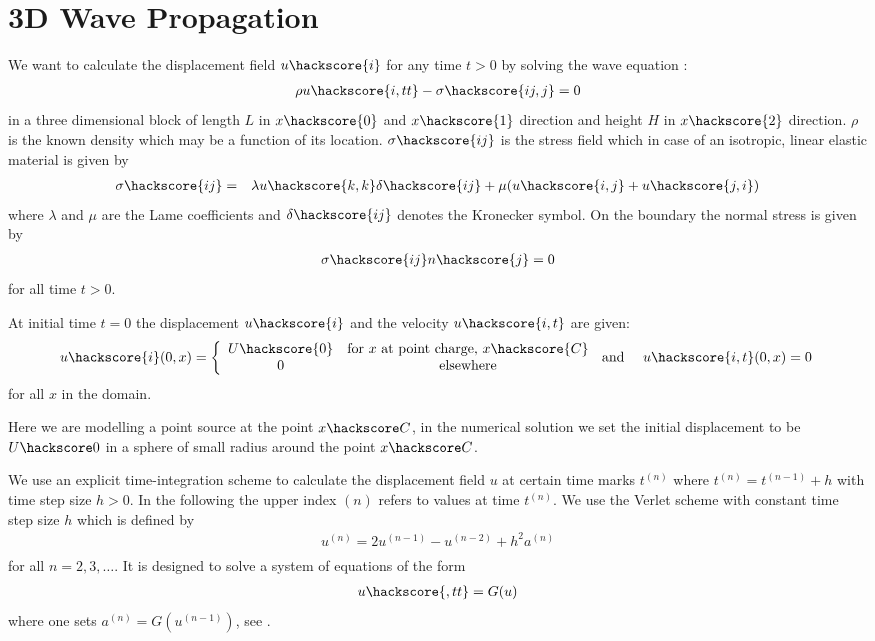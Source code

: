 \section{3D Wave Propagation}
\label{WAVE CHAP}

We want to calculate the displacement field $u\hackscore{i}$ for any time $t>0$ by solving the wave equation
:
\begin{eqnarray}\label{WAVE general problem}
\rho u\hackscore{i,tt} - \sigma\hackscore{ij,j}=0
\end{eqnarray}
in a three dimensional block of length $L$ in $x\hackscore{0}$
and $x\hackscore{1}$ direction and height $H$
in $x\hackscore{2}$ direction. $\rho$ is the known density which may be a function of its location.
$\sigma\hackscore{ij}$ is the stress field  which in case of an isotropic, linear elastic material is given by
\begin{eqnarray} \label{WAVE stress}
\sigma\hackscore{ij} & = & \lambda u\hackscore{k,k} \delta\hackscore{ij} + \mu ( u\hackscore{i,j} + u\hackscore{j,i})
\end{eqnarray}
where $\lambda$ and $\mu$ are the Lame coefficients 
 and $\delta\hackscore{ij}$ denotes the Kronecker symbol.
On the boundary the normal stress is given by
\begin{eqnarray} \label{WAVE natural}
\sigma\hackscore{ij}n\hackscore{j}=0
\end{eqnarray}
for all time $t>0$. 

At initial time $t=0$ the displacement 
$u\hackscore{i}$ and the velocity $u\hackscore{i,t}$ are given:
\begin{eqnarray} \label{WAVE initial}
u\hackscore{i}(0,x)= \left\{\begin{array}{cc} U\hackscore{0} & \mbox{for $x$ at point charge, $x\hackscore{C}$} \\ 0 & \mbox{elsewhere}\end{array}  \right. & \mbox{ and } & u\hackscore{i,t}(0,x)=0 \; 
\end{eqnarray}
for all $x$ in the domain. 

Here we are modelling a point source at the point $x\hackscore C$, in the numerical solution we
 set the initial displacement to be $U\hackscore 0$ in a sphere of small radius around the point
 $x\hackscore C$.  

We use an explicit time-integration scheme to calculate the displacement field $u$ at 
certain time marks $t^{(n)}$ where $t^{(n)}=t^{(n-1)}+h$ with time step size $h>0$. In the following the upper index ${(n)}$ refers to values at time $t^{(n)}$. We use the Verlet scheme  with constant time step size $h$
which is defined by
\begin{eqnarray} \label{WAVE dyn 2}
u^{(n)}=2u^{(n-1)}-u^{(n-2)} + h^2 a^{(n)} \\
\end{eqnarray}
for all $n=2,3,\ldots$. It is designed to solve a system of equations of the form
\begin{eqnarray} \label{WAVE dyn 2b} 
u\hackscore{,tt}=G(u)
\end{eqnarray}
where one sets $a^{(n)}=G(u^{(n-1)})$, see . 

